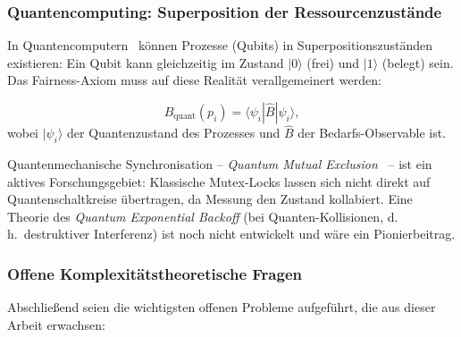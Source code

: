 ﻿\documentclass[a4paper,12pt]{article}
\theoremstyle{definition}
\begin{document}
\subsubsection{Quantencomputing: Superposition der Ressourcen\-zustände}

In Quantencomputern~\cite{nielsen2010quantum} können
Prozesse (Qubits) in Superpositionszuständen existieren:
Ein Qubit kann gleichzeitig im Zustand $|0\rangle$ (frei)
und $|1\rangle$ (belegt) sein. Das Fairness-Axiom muss auf
diese Realität verallgemeinert werden:

\[
  B_{\mathrm{quant}}(p_i)
  = \langle \psi_i | \hat{B} | \psi_i \rangle,
\]
wobei $|\psi_i\rangle$ der Quantenzustand des Prozesses
und $\hat{B}$ der Bedarfs-Observable ist.

Quantenmechanische Synchronisation -- \emph{Quantum Mutual
Exclusion}~\cite{mosca2007quantum} -- ist ein aktives
Forschungsgebiet: Klassische Mutex-Locks lassen sich nicht
direkt auf Quantenschaltkreise übertragen, da Messung den
Zustand kollabiert. Eine Theorie des \emph{Quantum Exponential
Backoff} (bei Quanten-Kollisionen, d.\,h.\ destruktiver
Interferenz) ist noch nicht entwickelt und wäre ein
Pionierbeitrag.

\subsubsection{Offene Komplexitätstheoretische Fragen}

Abschließend seien die wichtigsten offenen Probleme
aufgeführt, die aus dieser Arbeit erwachsen:
\end{document}
